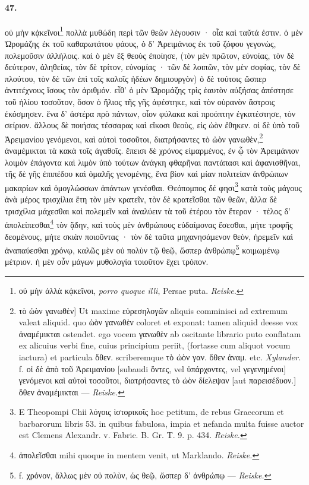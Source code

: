 \documentclass[a4paper, 11pt, oneside, polutonikogreek, german]{article}
\begin{document}
\paragraph{47.}
οὐ μὴν κᾀκεῖνοι\footnote{οὐ μὴν ἀλλὰ κᾀκεῖνοι, \emph{porro quoque illi}, Persae puta. \emph{Reiske.}} πολλὰ μυθώδη περὶ τῶν θεῶν λέγουσιν · οἷα καὶ ταῦτά ἐστιν. ὁ μὲν Ὡρομάζης ἐκ τοῦ καθαρωτάτου φάους, ὁ δ' Ἀρειμάνιος ἐκ τοῦ ζόφου γεγονὼς, πολεμοῦσιν ἀλλήλοις. καὶ ὁ μὲν ἓξ θεοὺς ἐποίησε, (τὸν μὲν πρῶτον, εὐνοίας, τὸν δὲ δεύτερον, ἀληθείας, τὸν δὲ τρίτον, εὐνομίας · τῶν δὲ λοιπῶν, τὸν μὲν σοφίας, τὸν δὲ πλούτου, τὸν δὲ τῶν ἐπὶ τοῖς καλοῖς ἡδέων δημιουργὸν) ὁ δὲ τούτοις ὥσπερ ἀντιτέχνους ἴσους τὸν ἀριθμόν. εἶθ' ὁ μὲν Ὡρομάζης τρὶς ἑαυτὸν αὐξήσας ἀπέστησε τοῦ ἡλίου τοσοῦτον, ὅσον ὁ ἥλιος τῆς γῆς ἀφέστηκε, καὶ τὸν οὐρανὸν ἄστροις ἐκόσμησεν. ἕνα δ' ἀστέρα πρὸ πάντων, οἷον φύλακα καὶ προόπτην ἐγκατέστησε, τὸν σείριον. ἄλλους δὲ ποιήσας τέσσαρας καὶ εἴκοσι θεοὺς, εἰς ὠὸν ἔθηκεν. οἱ δὲ ὑπὸ τοῦ Ἀρειμανίου γενόμενοι, καὶ αὐτοὶ τοσοῦτοι, διατρήσαντες τὸ ὠὸν γανωθὲν,\footnote{τὸ ὠὸν γανωθὲν] Ut maxime εὑρεσηλογῶν aliquis comminisci ad extremum valeat aliquid. quo ὠὸν γανωθὲν coloret et exponat: tamen aliquid deesse vox ἀναμέμικται ostendet. ego vocem γανωθὲν ab oscitante librario puto conflatam ex alicuius verbi fine, cuius principium periit, (fortasse cum aliquot vocum iactura) et particula ὅθεν. scriberemque τὸ ὠὸν γαν. ὅθεν ἀναμ. etc. \emph{Xylander.} f. οἱ δὲ ἀπὸ τοῦ Ἀρειμανίου [subaudi ὄντες, vel ὑπάρχοντες, vel γεγενημένοι] γενόμενοι καὶ αὐτοὶ τοσοῦτοι, διατρήσαντες τὸ ὠὸν δίελεψαν [aut παρεισέδυον.] ὅθεν ἀναμέμικται --- \emph{Reiske.}} ἀναμέμικται τὰ κακὰ τοῖς ἀγαθοῖς. ἔπεισι δὲ χρόνος εἱμαρμένος, ἐν ᾧ τὸν Ἀρειμάνιον λοιμὸν ἐπάγοντα καὶ λιμὸν ὑπὸ τούτων ἀνάγκη φθαρῆναι παντάπασι καὶ ἀφανισθῆναι, τῆς δὲ γῆς ἐπιπέδου καὶ ὁμαλῆς γενομένης, ἕνα βίον καὶ μίαν πολιτείαν ἀνθρώπων μακαρίων καὶ ὁμογλώσσων ἁπάντων γενέσθαι. Θεόπομπος δέ φησι\footnote{E Theopompi Chii λόγοις ἱστορικοῖς hoc petitum, de rebus Graecorum et barbarorum libris 53. in quibus fabulosa, impia et nefanda multa fuisse auctor est Clemens Alexandr. v. Fabric. B. Gr. T. 9. p. 434. \emph{Reiske.}} κατὰ τοὺς μάγους ἀνὰ μέρος τρισχίλια ἔτη τὸν μὲν κρατεῖν, τὸν δὲ κρατεῖσθαι τῶν θεῶν, ἄλλα δὲ τρισχίλια μάχεσθαι καὶ πολεμεῖν καὶ ἀναλύειν τὰ τοῦ ἑτέρου τὸν ἕτερον · τέλος δ' ἀπολείπεσθαι\footnote{ἀπολεῖσθαι mihi quoque in mentem venit, ut Marklando. \emph{Reiske.}} τὸν ᾅδην, καὶ τοὺς μὲν ἀνθρώπους εὐδαίμονας ἔσεσθαι, μήτε τροφῆς δεομένους, μήτε σκιὰν ποιοῦντας · τὸν δὲ ταῦτα μηχανησάμενον θεὸν, ἠρεμεῖν καὶ ἀναπαύεσθαι χρόνῳ, καλῶς μὲν οὐ πολὺν τῷ θεῷ, ὥσπερ ἀνθρώπῳ\footnote{f. χρόνον, ἄλλως μὲν οὐ πολὺν, ὡς θεῷ, ὥσπερ δ' ἀνθρώπῳ --- \emph{Reiske.}} κοιμωμένῳ μέτριον. ἡ μὲν οὖν μάγων μυθολογία τοιοῦτον ἔχει τρόπον.
\end{document}
